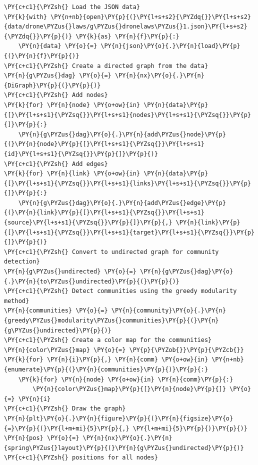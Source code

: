     \begin{tcolorbox}[breakable, size=fbox, boxrule=1pt, pad at break*=1mm,colback=cellbackground, colframe=cellborder]
\begin{Verbatim}[commandchars=\\\{\}]
\PY{c+c1}{\PYZsh{} Load the JSON data}
\PY{k}{with} \PY{n+nb}{open}\PY{p}{(}\PY{l+s+s2}{\PYZdq{}}\PY{l+s+s2}{data/drone\PYZus{}laws/g\PYZus{}dronelaws\PYZus{}1.json}\PY{l+s+s2}{\PYZdq{}}\PY{p}{)} \PY{k}{as} \PY{n}{f}\PY{p}{:}
    \PY{n}{data} \PY{o}{=} \PY{n}{json}\PY{o}{.}\PY{n}{load}\PY{p}{(}\PY{n}{f}\PY{p}{)}
\PY{c+c1}{\PYZsh{} Create a directed graph from the data}
\PY{n}{g\PYZus{}dag} \PY{o}{=} \PY{n}{nx}\PY{o}{.}\PY{n}{DiGraph}\PY{p}{(}\PY{p}{)}
\PY{c+c1}{\PYZsh{} Add nodes}
\PY{k}{for} \PY{n}{node} \PY{o+ow}{in} \PY{n}{data}\PY{p}{[}\PY{l+s+s1}{\PYZsq{}}\PY{l+s+s1}{nodes}\PY{l+s+s1}{\PYZsq{}}\PY{p}{]}\PY{p}{:}
    \PY{n}{g\PYZus{}dag}\PY{o}{.}\PY{n}{add\PYZus{}node}\PY{p}{(}\PY{n}{node}\PY{p}{[}\PY{l+s+s1}{\PYZsq{}}\PY{l+s+s1}{id}\PY{l+s+s1}{\PYZsq{}}\PY{p}{]}\PY{p}{)}
\PY{c+c1}{\PYZsh{} Add edges}
\PY{k}{for} \PY{n}{link} \PY{o+ow}{in} \PY{n}{data}\PY{p}{[}\PY{l+s+s1}{\PYZsq{}}\PY{l+s+s1}{links}\PY{l+s+s1}{\PYZsq{}}\PY{p}{]}\PY{p}{:}
    \PY{n}{g\PYZus{}dag}\PY{o}{.}\PY{n}{add\PYZus{}edge}\PY{p}{(}\PY{n}{link}\PY{p}{[}\PY{l+s+s1}{\PYZsq{}}\PY{l+s+s1}{source}\PY{l+s+s1}{\PYZsq{}}\PY{p}{]}\PY{p}{,} \PY{n}{link}\PY{p}{[}\PY{l+s+s1}{\PYZsq{}}\PY{l+s+s1}{target}\PY{l+s+s1}{\PYZsq{}}\PY{p}{]}\PY{p}{)}
\PY{c+c1}{\PYZsh{} Convert to undirected graph for community detection}
\PY{n}{g\PYZus{}undirected} \PY{o}{=} \PY{n}{g\PYZus{}dag}\PY{o}{.}\PY{n}{to\PYZus{}undirected}\PY{p}{(}\PY{p}{)}
\PY{c+c1}{\PYZsh{} Detect communities using the greedy modularity method}
\PY{n}{communities} \PY{o}{=} \PY{n}{community}\PY{o}{.}\PY{n}{greedy\PYZus{}modularity\PYZus{}communities}\PY{p}{(}\PY{n}{g\PYZus{}undirected}\PY{p}{)}
\PY{c+c1}{\PYZsh{} Create a color map for the communities}
\PY{n}{color\PYZus{}map} \PY{o}{=} \PY{p}{\PYZob{}}\PY{p}{\PYZcb{}}
\PY{k}{for} \PY{n}{i}\PY{p}{,} \PY{n}{comm} \PY{o+ow}{in} \PY{n+nb}{enumerate}\PY{p}{(}\PY{n}{communities}\PY{p}{)}\PY{p}{:}
    \PY{k}{for} \PY{n}{node} \PY{o+ow}{in} \PY{n}{comm}\PY{p}{:}
        \PY{n}{color\PYZus{}map}\PY{p}{[}\PY{n}{node}\PY{p}{]} \PY{o}{=} \PY{n}{i}
\PY{c+c1}{\PYZsh{} Draw the graph}
\PY{n}{plt}\PY{o}{.}\PY{n}{figure}\PY{p}{(}\PY{n}{figsize}\PY{o}{=}\PY{p}{(}\PY{l+m+mi}{5}\PY{p}{,} \PY{l+m+mi}{5}\PY{p}{)}\PY{p}{)}
\PY{n}{pos} \PY{o}{=} \PY{n}{nx}\PY{o}{.}\PY{n}{spring\PYZus{}layout}\PY{p}{(}\PY{n}{g\PYZus{}undirected}\PY{p}{)}  \PY{c+c1}{\PYZsh{} positions for all nodes}

\end{Verbatim}
\end{tcolorbox}
